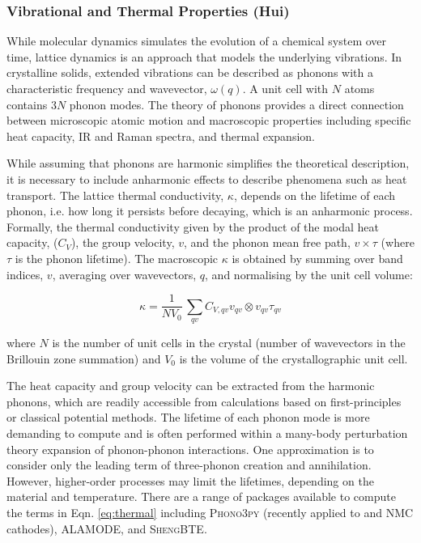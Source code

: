 \documentclass[../main.tex]{subfiles}
\begin{document}
\subsubsection{Vibrational and Thermal Properties (Hui)}
\label{sec:thermal_electronic_vibrational}
While molecular dynamics simulates the evolution of a chemical system over time, lattice dynamics is an approach that models the underlying vibrations. In crystalline solids, extended vibrations can be described as phonons with a characteristic frequency and wavevector, $\omega(q)$. A unit cell with $N$ atoms contains 3$N$ phonon modes. The theory of phonons provides a direct connection between microscopic atomic motion and macroscopic properties including specific heat capacity, IR and Raman spectra, and thermal expansion.\cite{ladd1986lattice, turney2009predicting,seko2015prediction} 

While assuming that phonons are harmonic simplifies the theoretical description, it is necessary to include anharmonic effects to describe phenomena such as heat transport. The lattice thermal conductivity, $\kappa$, depends on the lifetime of each phonon, i.e. how long it persists before decaying, which is an anharmonic process. Formally, the thermal conductivity given by the product of the modal heat capacity, ($C_V$), the group velocity, $v$, and the phonon mean free path, $v \times \tau$ (where $\tau$ is the phonon lifetime). The macroscopic $\kappa$ is obtained by summing over band indices, $v$, averaging over wavevectors, $q$, and normalising by the unit cell volume:

\begin{equation}
    \kappa = \frac{1}{NV_0} \,\sum_{qv} C_{V,qv} v_{qv} \otimes v_{qv} \tau_{qv}
    \label{eq:thermal}
\end{equation}

where $N$ is the number of unit cells in the crystal (number of wavevectors in the Brillouin zone summation) and $V_0$ is the volume of the crystallographic unit cell.

The heat capacity and group velocity can be extracted from the harmonic phonons, which are readily accessible from calculations based on first-principles or classical potential methods. The lifetime of each phonon mode is more demanding to compute and is often performed within a many-body perturbation theory expansion of phonon-phonon interactions. One approximation is to consider only the leading term of three-phonon creation and annihilation. \cite{togo_distributions_2015} However, higher-order processes may limit the lifetimes, depending on the material and temperature. There are a range of packages available to compute the terms in Eqn. \ref{eq:thermal} including \textsc{Phono3py} \cite{togo_distributions_2015} (recently applied to  and NMC cathodes)\cite{yang2019highly,yang2020chemical}, \textsc{ALAMODE}\cite{tadano2014anharmonic}, and \textsc{ShengBTE}\cite{ShengBTE_2014}.

 
\end{document}
